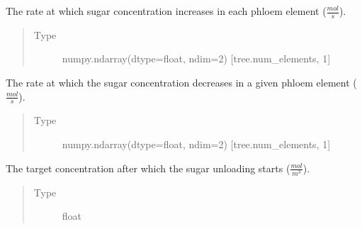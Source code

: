 \documentclass[letterpaper,10pt,english]{sphinxmanual}
\begin{document}
\begin{fulllineitems}

\begin{fulllineitems}
\label{\detokenize{index:src.tree.Tree.sugar_loading_rate}}
The rate at which sugar
concentration increases in each phloem element (\(\frac{mol}{s}\)).
\begin{quote}\begin{description}
\item[{Type}] \leavevmode
numpy.ndarray(dtype=float, ndim=2) {[}tree.num\_elements, 1{]}

\end{description}\end{quote}

\end{fulllineitems}


\begin{fulllineitems}
\label{\detokenize{index:src.tree.Tree.sugar_unloading_rate}}
The rate at which the
sugar concentration decreases in a given phloem element (\(\frac{mol}{s}\)).
\begin{quote}\begin{description}
\item[{Type}] \leavevmode
numpy.ndarray(dtype=float, ndim=2) {[}tree.num\_elements, 1{]}

\end{description}\end{quote}

\end{fulllineitems}


\begin{fulllineitems}
\label{\detokenize{index:src.tree.Tree.sugar_target_concentration}}
The target concentration after which the sugar unloading
starts (\(\frac{mol}{m^3}\)).
\begin{quote}\begin{description}
\item[{Type}] \leavevmode
float


\end{description}
\end{quote}
\end{fulllineitems}
\end{fulllineitems}
\end{document}
